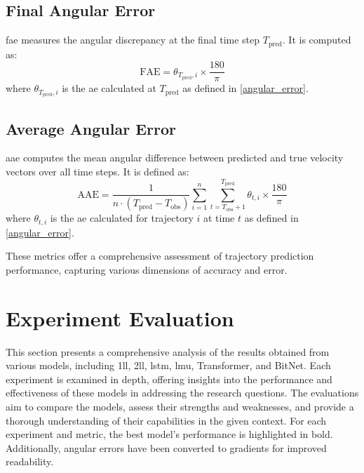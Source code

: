 \subsection{Final Angular Error}
\label{eq:fae}
\gls{fae} measures the angular discrepancy at the final time step \(T_{\text{pred}}\). It is computed as:
\begin{equation}
\text{FAE} = \theta_{T_{\text{pred}},i} \times \frac{180}{\pi}
\end{equation}
where \(\theta_{T_{\text{pred}},i}\) is the \gls{ae} calculated at \(T_{\text{pred}}\) as defined in \eqref{angular_error}.

\subsection{Average Angular Error}
\label{eq:aae}
\gls{aae} computes the mean angular difference between predicted and true velocity vectors over all time steps. It is defined as:
\begin{equation}
\text{AAE} = \frac{1}{n \cdot (T_{\text{pred}} - T_{\text{obs}})} \sum_{i=1}^n \sum_{t=T_{\text{obs}}+1}^{T_{\text{pred}}} \theta_{t,i} \times \frac{180}{\pi}
\end{equation}
where \(\theta_{t,i}\) is the \gls{ae} calculated for trajectory \(i\) at time \(t\) as defined in \eqref{angular_error}.

These metrics offer a comprehensive assessment of trajectory prediction performance, capturing various dimensions of accuracy and error.

\section{Experiment Evaluation}
\label{sec:eval}
This section presents a comprehensive analysis of the results obtained from various models, including \gls{1ll}, \gls{2ll}, \gls{lstm}, \gls{lmu}, Transformer, and BitNet. Each experiment is examined in depth, offering insights into the performance and effectiveness of these models in addressing the research questions. The evaluations aim to compare the models, assess their strengths and weaknesses, and provide a thorough understanding of their capabilities in the given context. For each experiment and metric, the best model's performance is highlighted in bold. Additionally, angular errors have been converted to gradients for improved readability.

